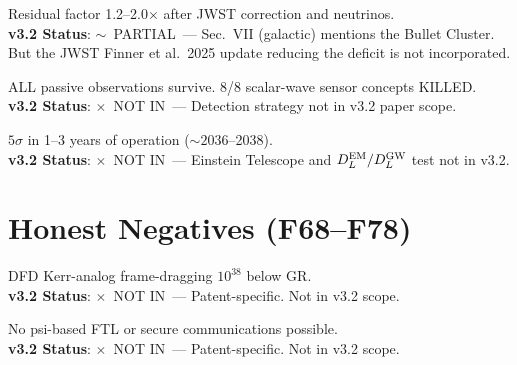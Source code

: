 \documentclass[11pt,a4paper]{article}
\newcommand{\vpartial}{\textcolor{statusPARTIAL}{$\sim$~PARTIAL}}
\newcommand{\vnot}{\textcolor{statusNOT}{$\times$~NOT IN}}
\begin{document}
\begin{tcolorbox}[colback=technical!5,colframe=technical,title=\textbf{F65: Bullet Cluster Deficit --- Downgraded Honest Negative}]
Residual factor 1.2--2.0$\times$ after JWST correction and neutrinos.\\
\textbf{v3.2 Status}: \vpartial\ --- Sec.~VII (galactic) mentions the Bullet Cluster. But the JWST Finner et al.\ 2025 update reducing the deficit is not incorporated.
\end{tcolorbox}

\begin{tcolorbox}[colback=technical!5,colframe=technical,title=\textbf{F66: Passive Superiority Theorem}]
ALL passive observations survive. 8/8 scalar-wave sensor concepts KILLED.\\
\textbf{v3.2 Status}: \vnot\ --- Detection strategy not in v3.2 paper scope.
\end{tcolorbox}

\begin{tcolorbox}[colback=technical!5,colframe=technical,title=\textbf{F67: Einstein Telescope as THE Decisive DFD Instrument}]
$5\sigma$ in 1--3 years of operation ($\sim 2036$--2038).\\
\textbf{v3.2 Status}: \vnot\ --- Einstein Telescope and $D_L^{\rm EM}/D_L^{\rm GW}$ test not in v3.2.
\end{tcolorbox}


\section{Honest Negatives (F68--F78)}\label{sec:negatives}

\begin{tcolorbox}[colback=negative!5,colframe=negative,title=\textbf{F68: P1 DEAD --- Zero Resources Recommended}]
DFD Kerr-analog frame-dragging $10^{38}$ below GR.\\
\textbf{v3.2 Status}: \vnot\ --- Patent-specific. Not in v3.2 scope.
\end{tcolorbox}

\begin{tcolorbox}[colback=negative!5,colframe=negative,title=\textbf{F69: P8 DEAD --- Comms Requires 1.6 Earth Masses}]
No psi-based FTL or secure communications possible.\\
\textbf{v3.2 Status}: \vnot\ --- Patent-specific. Not in v3.2 scope.
\end{tcolorbox}
\end{document}
